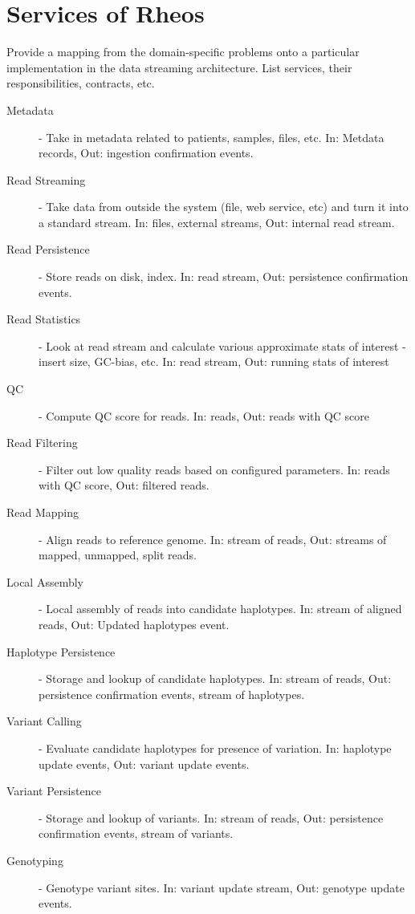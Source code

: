 \section{Services of Rheos}

Provide a mapping from the domain-specific problems onto a particular implementation in the data streaming architecture. List services, their responsibilities, contracts, etc.

\begin{description}
    \item [Metadata] - Take in metadata related to patients, samples, files, etc. In: Metdata records, Out: ingestion confirmation events.
    \item [Read Streaming] - Take data from outside the system (file, web service, etc) and turn it into a standard stream. In: files, external streams, Out: internal read stream.
    \item [Read Persistence] - Store reads on disk, index. In: read stream, Out: persistence confirmation events.
    \item [Read Statistics] - Look at read stream and calculate various approximate stats of interest - insert size, GC-bias,  etc. In: read stream, Out: running stats of interest
    \item [QC] - Compute QC score for reads. In: reads, Out: reads with QC score
    \item [Read Filtering] - Filter out low quality reads based on configured parameters. In: reads with QC score, Out: filtered reads.
    \item [Read Mapping] - Align reads to reference genome. In: stream of reads, Out: streams of mapped, unmapped, split reads.
    \item [Local Assembly] - Local assembly of reads into candidate haplotypes. In: stream of aligned reads, Out: Updated haplotypes event.
    \item [Haplotype Persistence] - Storage and lookup of candidate haplotypes. In: stream of reads, Out: persistence confirmation events, stream of haplotypes.
    \item [Variant Calling] - Evaluate candidate haplotypes for presence of variation. In: haplotype update events, Out: variant update events.
    \item [Variant Persistence] - Storage and lookup of variants. In: stream of reads, Out: persistence confirmation events, stream of variants.
    \item [Genotyping] - Genotype variant sites. In: variant update stream, Out: genotype update events.

\end{description}
